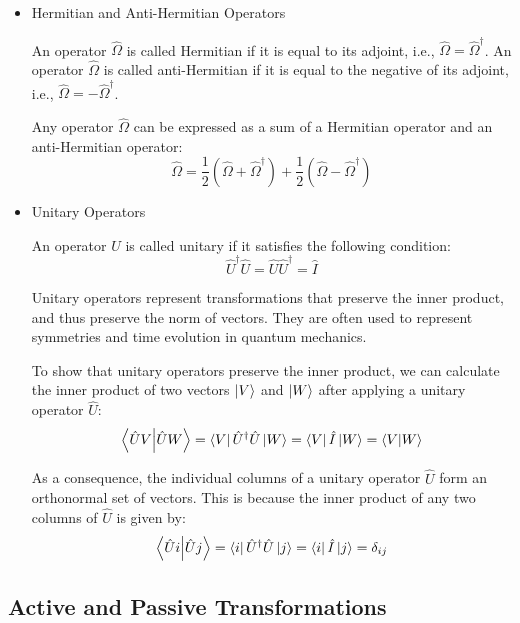 \documentclass[12pt,a4paper]{report}
\begin{document}
\begin{itemize}

\item Hermitian and Anti-Hermitian Operators

An operator $\hat{\Omega}$ is called Hermitian if it is equal to its adjoint, i.e., $\hat{\Omega} = \hat{\Omega}^\dagger$.
An operator $\hat{\Omega}$ is called anti-Hermitian if it is equal to the negative of its adjoint, i.e., $\hat{\Omega} = -\hat{\Omega}^\dagger$.

Any operator $\hat{\Omega}$ can be expressed as a sum of a Hermitian operator and an anti-Hermitian operator:
\begin{equation*}
    \hat{\Omega} = \frac{1}{2}(\hat{\Omega} + \hat{\Omega}^\dagger) + \frac{1}{2}(\hat{\Omega} - \hat{\Omega}^\dagger)
\end{equation*}

\item Unitary Operators

An operator $\hat{U}$ is called unitary if it satisfies the following condition:
\begin{equation*}
    \hat{U}^\dagger \hat{U} = \hat{U} \hat{U}^\dagger = \hat{I}
\end{equation*}

Unitary operators represent transformations that preserve the inner product, and thus preserve the norm of vectors. They are often used to represent symmetries and time evolution in quantum mechanics.

To show that unitary operators preserve the inner product, we can calculate the inner product of two vectors $\ket{V}$ and $\ket{W}$ after applying a unitary operator $\hat{U}$:
\begin{equation*}
    \bra{\hat{U}V}\ket{\hat{U}W} = \bra{V}\hat{U}^\dagger \hat{U}\ket{W} = \bra{V}\hat{I}\ket{W} = \bra{V}\ket{W}
\end{equation*}

As a consequence, the individual columns of a unitary operator $\hat{U}$ form an orthonormal set of vectors. This is because the inner product of any two columns of $\hat{U}$ is given by:
\begin{equation*}
    \bra{\hat{U}i}\ket{\hat{U}j} = \bra{i}\hat{U}^\dagger \hat{U}\ket{j} = \bra{i}\hat{I}\ket{j} = \delta_{ij}
\end{equation*}

\end{itemize}

\subsection{Active and Passive Transformations}
\end{document}

